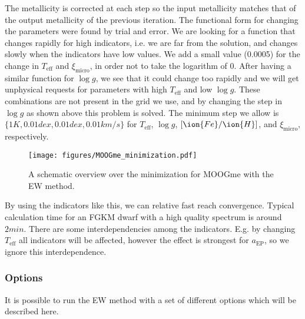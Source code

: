 \documentclass{aa}
\begin{document}
The metallicity is corrected at each step so the input metallicity matches
that of the output metallicity of the previous iteration. The functional
form for changing the parameters were found by trial and error. We are looking
for a function that changes rapidly for high indicators, i.e. we are far from
the solution, and changes slowly when the indicators have low values. We add
a small value (0.0005) for the change in $T_\mathrm{eff}$ and $\xi_\mathrm{micro}$,
in order not to take the logarithm of 0. After having a similar
function for $\log g$, we see that it could change too rapidly and we will
get unphysical requests for parameters with high $T_\mathrm{eff}$ and low
$\log g$. These combinations are not present in the grid we use, and by
changing the step in $\log g$ as shown above this problem is solved. The
minimum step we allow is $\{   {1}{K},    {0.01}{dex},    {0.01}{dex},
   {0.01}{km/s}\}$ for $T_\mathrm{eff}$, $\log g$, $[\ion{Fe}/\ion{H}]$, and
$\xi_\mathrm{micro}$, respectively.

\begin{figure}[tpb]
    \centering
    \texttt{[image: figures/MOOGme\_minimization.pdf]}
    \caption{A schematic overview over the minimization for MOOGme with the
    EW method.}
    \label{fig:MOOGme_minimization}
\end{figure}

By using the indicators like this, we can relative fast reach convergence.
Typical calculation time for an FGKM dwarf with a high quality spectrum
is around $   {2}{min}$.
There are some interdependencies among the indicators. E.g. by changing
$T_\mathrm{eff}$ all indicators will be affected, however the effect is
strongest for $a_\mathrm{EP}$, so we ignore this interdependence.

\subsubsection{Options}
\label{subs:EWoptions}
It is possible to run the EW method with a set of different options which
will be described here.
\end{document}
